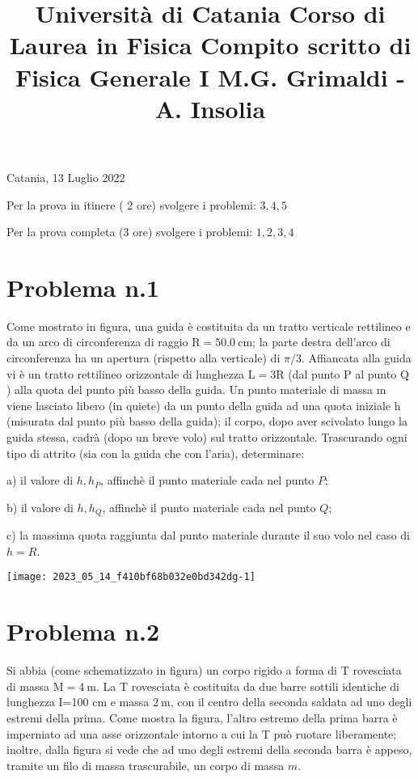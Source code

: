 \documentclass[10pt]{article}
\title{Università di Catania 
 Corso di Laurea in Fisica 
 Compito scritto di Fisica Generale I 
 M.G. Grimaldi - A. Insolia }
\author{}
\date{}
\begin{document}
\maketitle
Catania, 13 Luglio 2022

Per la prova in itinere ( 2 ore) svolgere i problemi: \(3,4,5\)

Per la prova completa (3 ore) svolgere i problemi: \(1,2,3,4\)

\section{Problema n.1}
Come mostrato in figura, una guida è costituita da un tratto verticale rettilineo e da un arco di circonferenza di raggio \(\mathrm{R}=50.0 \mathrm{~cm}\); la parte destra dell'arco di circonferenza ha un apertura (rispetto alla verticale) di \(\pi / 3\). Affiancata alla guida vi è un tratto rettilineo orizzontale di lunghezza \(\mathrm{L}=3 \mathrm{R}\) (dal punto \(\mathrm{P}\) al punto \(\mathrm{Q}\) ) alla quota del punto più basso della guida. Un punto materiale di massa m viene lasciato libero (in quiete) da un punto della guida ad una quota iniziale \(\mathrm{h}\) (misurata dal punto più basso della guida); il corpo, dopo aver scivolato lungo la guida stessa, cadrà (dopo un breve volo) sul tratto orizzontale. Trascurando ogni tipo di attrito (sia con la guida che con l'aria), determinare:

a) il valore di \(h, h_{P}\), affinchè il punto materiale cada nel punto \(P\);

b) il valore di \(h, h_{Q}\), affinchè il punto materiale cada nel punto \(Q\);

c) la massima quota raggiunta dal punto materiale durante il suo volo nel caso di \(h=R\).

\begin{center}
\texttt{[image: 2023\_05\_14\_f410bf68b032e0bd342dg-1]}
\end{center}

\section{Problema n.2}
Si abbia (come schematizzato in figura) un corpo rigido a forma di T rovesciata di massa \(\mathrm{M}=4 \mathrm{~m}\). La T rovesciata è costituita da due barre sottili identiche di lunghezza I=100 cm e massa \(2 \mathrm{~m}\), con il centro della seconda saldata ad uno degli estremi della prima. Come mostra la figura, l'altro estremo della prima barra è imperniato ad una asse orizzontale intorno a cui la T può ruotare liberamente; inoltre, dalla figura si vede che ad uno degli estremi della seconda barra è appeso, tramite un filo di massa trascurabile, un corpo di massa \(m\).
\end{document}
